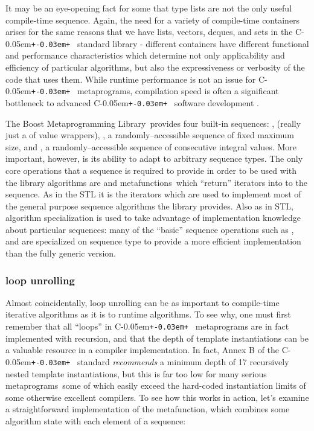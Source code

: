 \documentclass{kapproc}
\newcommand{\Cpp}{C\kern-0.05em\texttt{+\kern-0.03em+}%
}
\newcommand{\Mpl}{Boost Meta\-pro\-gram\-ming Library}
\newcommand{\mpgms}{meta\-pro\-grams}
\newcommand{\mfn}{meta\-func\-tion}
\newcommand{\mfns}{meta\-func\-tions}
\begin{document}
It may be an eye-opening fact for some that type lists are not the
only useful compile-time sequence. Again, the need for a variety of
compile-time containers arises for the same reasons that we have
lists, vectors, deques, and sets in the \Cpp\ standard library -
different containers have different functional and performance
characteristics which determine not only applicability and efficiency
of particular algorithms, but also the expressiveness or verbosity of
the code that uses them. While runtime performance is not an issue for
\Cpp\ metaprograms, compilation speed is often a significant
bottleneck to advanced \Cpp\ software development \cite{Abr01}.

The \Mpl\ provides four built-in sequences: ,
 (really just a  of value
wrappers), , a randomly--accessible sequence of
fixed maximum size, and , a randomly--accessible
sequence of consecutive integral values. More important, however, is
its ability to adapt to arbitrary sequence types. The only core
operations that a sequence is required to provide in order to be used
with the library algorithms are  and  \mfns\
which ``return'' iterators into to the sequence. As in the STL it is
the iterators which are used to implement most of the general purpose
sequence algorithms the library provides. Also as in STL, algorithm
specialization is used to take advantage of implementation knowledge
about particular sequences: many of the ``basic'' sequence operations
such as \code{back<>}, \code{front<>} \code{size<>} and \code{at<>}
are specialized on sequence type to provide a more efficient
implementation than the fully generic version.


  \subsubsection{loop unrolling}

Almost coincidentally, loop unrolling can be as important to
compile-time iterative algorithms as it is to runtime algorithms. To
see why, one must first remember that all ``loops'' in \Cpp\
metaprograms are in fact implemented with recursion, and that the
depth of template instantiations can be a valuable resource in a
compiler implementation. In fact, Annex B of the \Cpp\ standard
\emph{recommends} a minimum depth of 17 recursively nested template
instantiations, but this is far too low for many serious \mpgms\ some
of which easily exceed the hard-coded instantiation limits of some
otherwise excellent compilers. To see how this works in action, let's
examine a straightforward implementation of the \code{fold} \mfn,
which combines some algorithm state with each element of a sequence:
\end{document}
